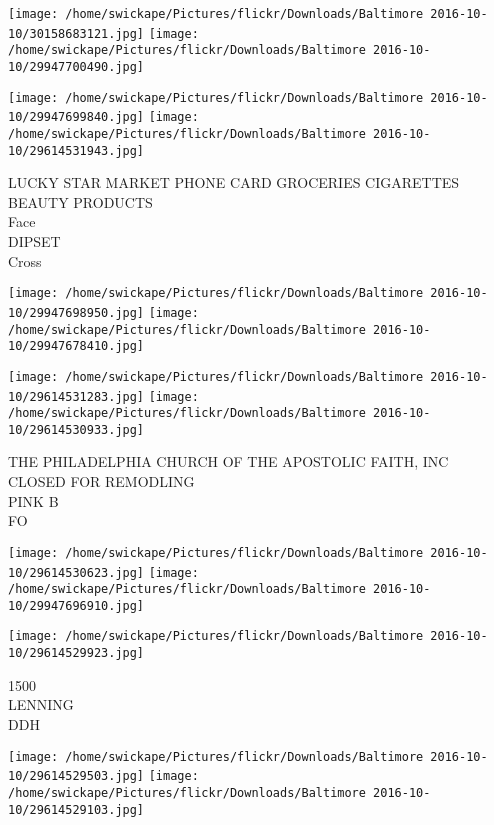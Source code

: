 \documentclass[10pt,letterpaper]{article}
\begin{document}
\texttt{[image: /home/swickape/Pictures/flickr/Downloads/Baltimore 2016-10-10/30158683121.jpg]}
\texttt{[image: /home/swickape/Pictures/flickr/Downloads/Baltimore 2016-10-10/29947700490.jpg]}

\texttt{[image: /home/swickape/Pictures/flickr/Downloads/Baltimore 2016-10-10/29947699840.jpg]}
\texttt{[image: /home/swickape/Pictures/flickr/Downloads/Baltimore 2016-10-10/29614531943.jpg]}

LUCKY STAR MARKET PHONE CARD GROCERIES CIGARETTES BEAUTY PRODUCTS\\
Face\\
DIPSET\\
Cross\\
\pagebreak

\texttt{[image: /home/swickape/Pictures/flickr/Downloads/Baltimore 2016-10-10/29947698950.jpg]}
\texttt{[image: /home/swickape/Pictures/flickr/Downloads/Baltimore 2016-10-10/29947678410.jpg]}

\texttt{[image: /home/swickape/Pictures/flickr/Downloads/Baltimore 2016-10-10/29614531283.jpg]}
\texttt{[image: /home/swickape/Pictures/flickr/Downloads/Baltimore 2016-10-10/29614530933.jpg]}

THE PHILADELPHIA CHURCH OF THE APOSTOLIC FAITH, INC\\
CLOSED FOR REMODLING\\
PINK B\\
FO\\
\pagebreak

\texttt{[image: /home/swickape/Pictures/flickr/Downloads/Baltimore 2016-10-10/29614530623.jpg]}
\texttt{[image: /home/swickape/Pictures/flickr/Downloads/Baltimore 2016-10-10/29947696910.jpg]}

\vspace{0.25in}
\texttt{[image: /home/swickape/Pictures/flickr/Downloads/Baltimore 2016-10-10/29614529923.jpg]}

1500\\
LENNING\\
DDH\\
\pagebreak

\texttt{[image: /home/swickape/Pictures/flickr/Downloads/Baltimore 2016-10-10/29614529503.jpg]}
\texttt{[image: /home/swickape/Pictures/flickr/Downloads/Baltimore 2016-10-10/29614529103.jpg]}
\end{document}
